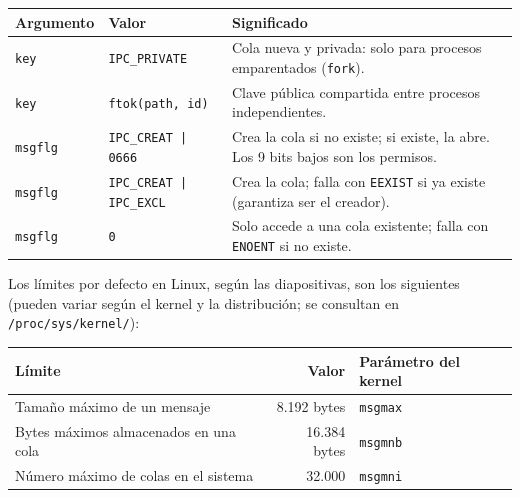 \documentclass[12pt,a4paper]{article}
\begin{document}
\begin{table}[h]
\centering
\small
\begin{tabular}{|l|l|p{7.2cm}|}
\hline
\textbf{Argumento} & \textbf{Valor} & \textbf{Significado} \\ \hline
\texttt{key} & \texttt{IPC\_PRIVATE} & Cola nueva y privada: solo para procesos emparentados (\texttt{fork}). \\ \hline
\texttt{key} & \texttt{ftok(path, id)} & Clave pública compartida entre procesos independientes. \\ \hline
\texttt{msgflg} & \texttt{IPC\_CREAT | 0666} & Crea la cola si no existe; si existe, la abre. Los 9 bits bajos son los permisos. \\ \hline
\texttt{msgflg} & \texttt{IPC\_CREAT | IPC\_EXCL} & Crea la cola; falla con \texttt{EEXIST} si ya existe (garantiza ser el creador). \\ \hline
\texttt{msgflg} & \texttt{0} & Solo accede a una cola existente; falla con \texttt{ENOENT} si no existe. \\ \hline
\end{tabular}
\end{table}

\noindent Los límites por defecto en Linux, según las diapositivas, son los siguientes (pueden variar según el kernel y la distribución; se consultan en \texttt{/proc/sys/kernel/}):

\begin{table}[h]
\centering
\small
\begin{tabular}{|l|r|l|}
\hline
\textbf{Límite} & \textbf{Valor} & \textbf{Parámetro del kernel} \\ \hline
Tamaño máximo de un mensaje & 8.192 bytes & \texttt{msgmax} \\ \hline
Bytes máximos almacenados en una cola & 16.384 bytes & \texttt{msgmnb} \\ \hline
Número máximo de colas en el sistema & 32.000 & \texttt{msgmni} \\ \hline
\end{tabular}
\end{table}
\end{document}
